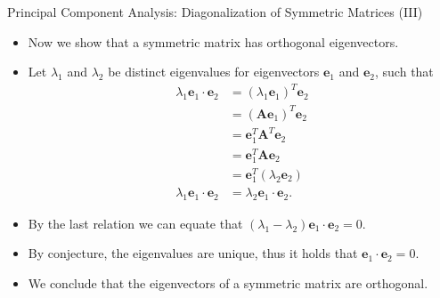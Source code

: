 \begin{frame}{Principal Component Analysis: Diagonalization of Symmetric 
Matrices (III)}
	\begin{itemize}
		\item Now we show that a symmetric matrix has orthogonal eigenvectors.
		\item Let $\lambda_1$ and $\lambda_2$ be distinct eigenvalues for 
		eigenvectors $\mathbf{e}_1$ and $\mathbf{e}_2$, such that
		\begin{align}
			\lambda_1\mathbf{e}_1 \cdot \mathbf{e}_2 & = (\lambda_1 
			\mathbf{e}_1)^{T} \mathbf{e}_2  \\
			& = (\mathbf{Ae}_1)^{T}\mathbf{e}_2            \\
			& = \mathbf{e}_1^T \mathbf{A}^T \mathbf{e}_2   \\
			& = \mathbf{e}_1^T \mathbf{A}\mathbf{e}_2      \\
			& = \mathbf{e}_1^T (\lambda_2 \mathbf{e}_2)    \\
			\lambda_1\mathbf{e}_1 \cdot \mathbf{e}_2 & = \lambda_2 \mathbf{e}_1 
			\cdot \mathbf{e}_2. 
		\end{align}
		\item By the last relation we can equate that $(\lambda_1 - \lambda_2) 
		\mathbf{e}_1 \cdot \mathbf{e}_2 = 0$.
		\item By conjecture, the eigenvalues are unique, thus it holds that 
		$\mathbf{e}_1 \cdot \mathbf{e}_2 = 0$.
		\item We conclude that the eigenvectors of a symmetric matrix are 
		orthogonal.
	\end{itemize}
\end{frame}

